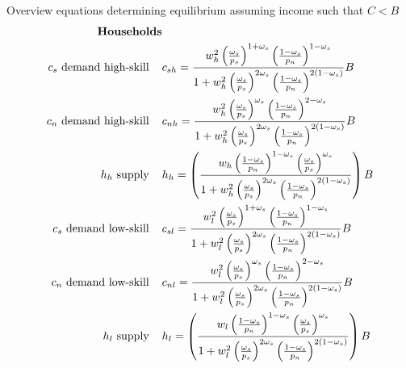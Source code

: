 \newpage
Overview equations determining equilibrium assuming income such that $C<B$
\begin{align}
\text{\textbf{Households}}& \nonumber \\
\text{$c_s$ demand high-skill}\hspace{4mm}&c_{sh}=\frac{w_h^2\left(\frac{\omega_s}{p_s}\right)^{1+\omega_s}\left(\frac{1-\omega_s}{p_n}\right)^{1-\omega_s}}{1+w_h^2\left(\frac{\omega_s}{p_s}\right)^{2\omega_s}\left(\frac{1-\omega_s}{p_n}\right)^{2(1-\omega_s)}}B\\
\text{$c_n$ demand high-skill}\hspace{4mm}&c_{nh} = \frac{w_h^2\left(\frac{\omega_s}{p_s}\right)^{\omega_s}\left(\frac{1-\omega_s}{p_n}\right)^{2-\omega_s}}{1+w_h^2\left(\frac{\omega_s}{p_s}\right)^{2\omega_s}\left(\frac{1-\omega_s}{p_n}\right)^{2(1-\omega_s)}}B\\
\text{$h_h$ supply}\hspace{4mm}&
h_h= \left(\frac{w_h \left(\frac{1-\omega_s}{p_n}\right)^{1-\omega_s}\left(\frac{\omega_s}{p_s}\right)^{\omega_s}}{1+w_h^2\left(\frac{\omega_s}{p_s}\right)^{2\omega_s}\left(\frac{1-\omega_s}{p_n}\right)^{2(1-\omega_s)}}\right)B\\
\text{$c_s$ demand low-skill}\hspace{4mm}&c_{sl}=\frac{w_l^2\left(\frac{\omega_s}{p_s}\right)^{1+\omega_s}\left(\frac{1-\omega_s}{p_n}\right)^{1-\omega_s}}{1+w_l^2\left(\frac{\omega_s}{p_s}\right)^{2\omega_s}\left(\frac{1-\omega_s}{p_n}\right)^{2(1-\omega_s)}}B\\
\text{$c_n$ demand low-skill}\hspace{4mm}&c_{nl}=\frac{w_l^2\left(\frac{\omega_s}{p_s}\right)^{\omega_s}\left(\frac{1-\omega_s}{p_n}\right)^{2-\omega_s}}{1+w_l^2\left(\frac{\omega_s}{p_s}\right)^{2\omega_s}\left(\frac{1-\omega_s}{p_n}\right)^{2(1-\omega_s)}}B\\
\text{$h_l$ supply}\hspace{4mm}& h_l= \left(\frac{w_l \left(\frac{1-\omega_s}{p_n}\right)^{1-\omega_s}\left(\frac{\omega_s}{p_s}\right)^{\omega_s}}{1+w_l^2\left(\frac{\omega_s}{p_s}\right)^{2\omega_s}\left(\frac{1-\omega_s}{p_n}\right)^{2(1-\omega_s)}}\right)B
\end{align}
\newpage
